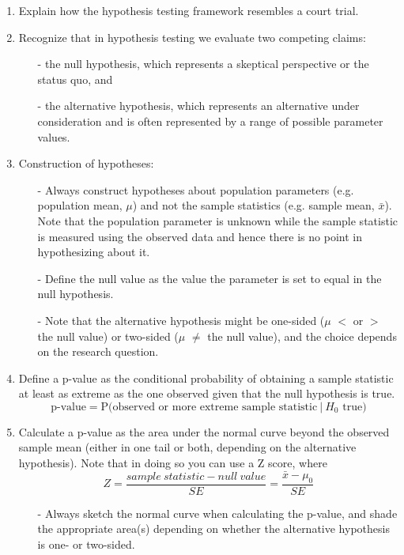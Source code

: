 \documentclass[11pt]{article}
\begin{document}
%

\vspace{0.5cm}

%

\begin{enumerate}[resume]
\renewcommand\labelenumi{\textcolor{light}{\textbf{LO \theenumi.}}}

\item Explain how the hypothesis testing framework resembles a court trial.

\item Recognize that in hypothesis testing we evaluate two competing claims: 
\begin{itemize}
\item[-] the null hypothesis, which represents a skeptical perspective or the status quo, and 
\item[-] the alternative hypothesis, which represents an alternative under consideration and is often represented by a range of possible parameter values.
\end{itemize}

\item Construction of hypotheses:
\begin{itemize}
\item[-] Always construct hypotheses about population parameters (e.g. population mean, $\mu$) and not the sample statistics (e.g. sample mean, $\bar{x}$). Note that the population parameter is unknown while the sample statistic is measured using the observed data and hence there is no point in hypothesizing about it.
\item[-] Define the null value as the value the parameter is set to equal in the null hypothesis.
\item[-] Note that the alternative hypothesis might be one-sided ($\mu$ $<$ or $>$ the null value) or two-sided ($\mu$ $\ne$ the null value), and the choice depends on the research question.
\end{itemize}

\item Define a p-value as the conditional probability of obtaining a sample statistic at least as extreme as the one observed given that the null hypothesis is true.
\[ \text{p-value} = \text{P(observed or more extreme sample statistic}~|~H_0 \text{ true)} \]

\item Calculate a p-value as the area under the normal curve beyond the observed sample mean (either in one tail or both, depending on the alternative hypothesis). Note that in doing so you can use a Z score, where
\[ Z = \frac{sample~statistic - null~value}{SE} = \frac{\bar{x} - \mu_0}{SE} \]
\begin{itemize}
\item[-] Always sketch the normal curve when calculating the p-value, and shade the appropriate area(s) depending on whether the alternative hypothesis is one- or two-sided.
\end{itemize}


\end{enumerate}
\end{document}
